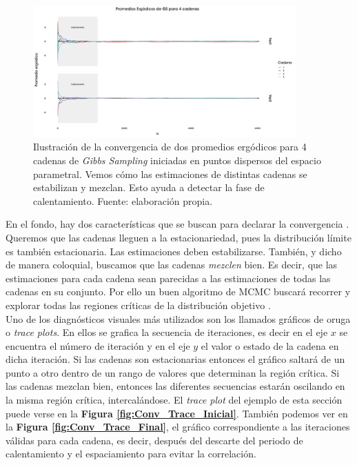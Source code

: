 \begin{figure}[h]
	\centering
	\includegraphics[width=0.9\textwidth]{Figs/Bayes/Ejemplos_Convergencia_Prom_Erg}
	\caption{Ilustración de la convergencia de dos promedios ergódicos para 4 cadenas de \textit{Gibbs Sampling} iniciadas en puntos dispersos del espacio parametral. Vemos cómo las estimaciones de distintas cadenas se estabilizan y mezclan. Esto ayuda a detectar la fase de calentamiento. Fuente: elaboración propia.}
	\label{fig:Conv_Prom_Erg}	
\end{figure}

En el fondo, hay dos características que se buscan para declarar la convergencia \parencite{Gelman13}. Queremos que las cadenas lleguen a la estacionariedad, pues la distribución límite es también estacionaria. Las estimaciones deben estabilizarse. También, y dicho de manera coloquial, buscamos que las cadenas \textit{mezclen} bien. Es decir, que las estimaciones para cada cadena sean parecidas a las estimaciones de todas las cadenas en su conjunto. Por ello un buen algoritmo de MCMC buscará recorrer y explorar todas las regiones críticas de la distribución objetivo \parencites{Neal93,Betancourt18}.\\ 

Uno de los diagnósticos visuales más utilizados son los llamados gráficos de oruga o \textit{trace plots}. En ellos se grafica la secuencia de iteraciones, es decir en el eje $x$ se encuentra el número de iteración y en el eje $y$ el valor o estado de la cadena en dicha iteración. Si las cadenas son estacionarias entonces el gráfico saltará de un punto a otro dentro de un rango de valores que determinan la región crítica. Si las cadenas mezclan bien, entonces las diferentes secuencias estarán oscilando en la misma región crítica, intercalándose. El \textit{trace plot} del ejemplo de esta sección puede verse en la \textbf{Figura \ref{fig:Conv_Trace_Inicial}}. También podemos ver en la \textbf{Figura \ref{fig:Conv_Trace_Final}}, el gráfico correspondiente a las iteraciones válidas para cada cadena, es decir, después del descarte del periodo de calentamiento y el espaciamiento para evitar la correlación.\\

